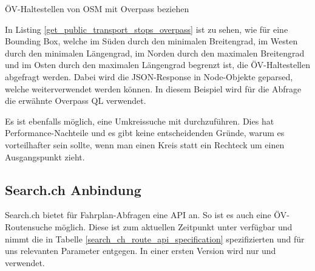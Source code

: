 \begin{listing}[ht]
    \inputminted{python}{projectdoc/listing/get_public_transport_stops_overpass.py}
    \caption{ÖV-Haltestellen von \acs{OSM} mit Overpass beziehen}
    \label{get_public_transport_stops_overpass}
\end{listing}

In Listing \ref{get_public_transport_stops_overpass} ist zu sehen, wie für eine Bounding Box, welche im Süden durch den minimalen Breitengrad, im Westen durch den minimalen Längengrad, im Norden durch den maximalen Breitengrad und im Osten durch den maximalen Längengrad begrenzt ist, die ÖV-Haltestellen abgefragt werden. Dabei wird die JSON-Response in Node-Objekte geparsed, welche weiterverwendet werden können. In diesem Beispiel wird für die Abfrage die erwähnte Overpass QL verwendet.

Es ist ebenfalls möglich, eine Umkreissuche mit  durchzuführen. Dies hat Performance-Nachteile und es gibt keine entscheidenden Gründe, warum es vorteilhafter sein sollte, wenn man einen Kreis statt ein Rechteck um einen Ausgangspunkt zieht.

\subsection{Search.ch Anbindung}
\label{analyse:Search.ch Anbindung}
Search.ch bietet für Fahrplan-Abfragen eine API\cite{search_ch_route_api} an. So ist es auch eine ÖV-Routensuche möglich. Diese ist zum aktuellen Zeitpunkt unter \cite{search_ch_route_api} verfügbar und nimmt die in Tabelle \ref{search_ch_route_api_specification} spezifizierten und für uns relevanten Parameter entgegen. In einer ersten Version wird nur  und  verwendet.


